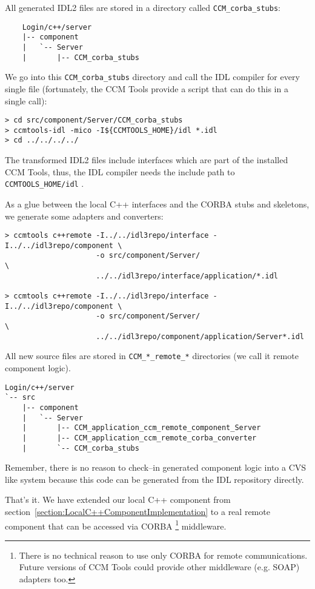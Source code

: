 All generated IDL2 files are stored in a directory called {\tt CCM\_corba\_stubs}:
\begin{verbatim}
    Login/c++/server
    |-- component
    |   `-- Server
    |       |-- CCM_corba_stubs
\end{verbatim}

We go into this {\tt CCM\_corba\_stubs} directory and call the IDL compiler for
every single file (fortunately, the CCM Tools provide a script that can do this
in a single call):
\begin{verbatim}
> cd src/component/Server/CCM_corba_stubs
> ccmtools-idl -mico -I${CCMTOOLS_HOME}/idl *.idl
> cd ../../../../
\end{verbatim}

The transformed IDL2 files include interfaces which are part of the
installed CCM Tools, thus, the IDL compiler needs the include path to {\tt CCMTOOLS\_HOME/idl} .

\vspace{3mm}
As a glue between the local C++ interfaces and the CORBA stubs and skeletons, we
generate some adapters and converters:
\begin{verbatim}
> ccmtools c++remote -I../../idl3repo/interface -I../../idl3repo/component \
                     -o src/component/Server/                              \
                     ../../idl3repo/interface/application/*.idl

> ccmtools c++remote -I../../idl3repo/interface -I../../idl3repo/component \
                     -o src/component/Server/                              \
                     ../../idl3repo/component/application/Server*.idl
\end{verbatim}

All new source files are stored in {\tt CCM\_*\_remote\_*} directories (we call
it remote component logic).
\begin{verbatim}
Login/c++/server
`-- src
    |-- component
    |   `-- Server
    |       |-- CCM_application_ccm_remote_component_Server
    |       |-- CCM_application_ccm_remote_corba_converter
    |       `-- CCM_corba_stubs
\end{verbatim}
Remember, there is no reason to check--in generated component logic into a CVS
like system because this code can be generated from the IDL repository directly.

\vspace{3mm}
That's it. We have extended our local C++ component from 
section~\ref{section:LocalC++ComponentImplementation} to a real remote component 
that can be accessed via CORBA
\footnote{
There is no technical reason to use only CORBA for remote communications.
Future versions of CCM Tools could provide other middleware (e.g. SOAP)
adapters too. } 
middleware.

